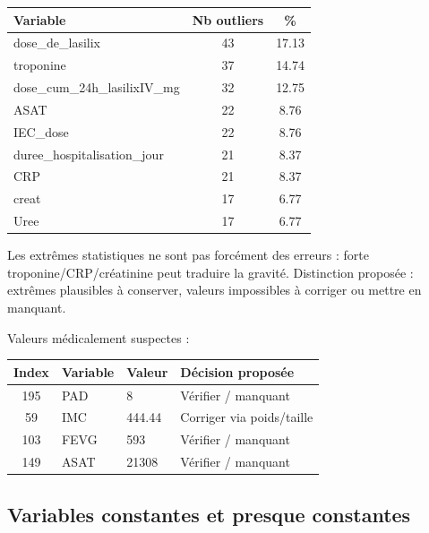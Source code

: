 \documentclass[12pt,a4paper]{report}
\begin{document}
\begin{center}
\renewcommand{\arraystretch}{1.2}
\begin{tabular}{@{}l c c@{}}
\toprule
\textbf{Variable} & \textbf{Nb outliers} & \textbf{\%} \\
\midrule
dose\_de\_lasilix & 43 & 17.13 \\
troponine & 37 & 14.74 \\
dose\_cum\_24h\_lasilixIV\_mg & 32 & 12.75 \\
ASAT & 22 & 8.76 \\
IEC\_dose & 22 & 8.76 \\
duree\_hospitalisation\_jour & 21 & 8.37 \\
CRP & 21 & 8.37 \\
creat & 17 & 6.77 \\
Uree & 17 & 6.77 \\
\bottomrule
\end{tabular}
\end{center}

Les extrêmes statistiques ne sont pas forcément des erreurs : forte troponine/CRP/créatinine
peut traduire la gravité. Distinction proposée : extrêmes plausibles à conserver,
valeurs impossibles à corriger ou mettre en manquant.

Valeurs médicalement suspectes :
\begin{center}
\renewcommand{\arraystretch}{1.2}
\begin{tabular}{@{}c l l l@{}}
\toprule
\textbf{Index} & \textbf{Variable} & \textbf{Valeur} & \textbf{Décision proposée} \\
\midrule
195 & PAD & 8 & Vérifier / manquant \\
59 & IMC & 444.44 & Corriger via poids/taille \\
103 & FEVG & 593 & Vérifier / manquant \\
149 & ASAT & 21308 & Vérifier / manquant \\
\bottomrule
\end{tabular}
\end{center}

\subsection{Variables constantes et presque constantes}
\end{document}
